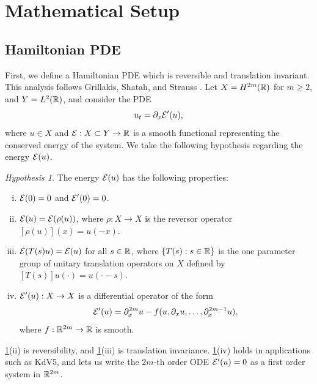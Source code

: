 \documentclass[12pt]{elsarticle}
\theoremstyle{plain}
\theoremstyle{definition}
\theoremstyle{remark}
\newtheorem{hypothesis}[theorem]{Hypothesis}
\numberwithin{theorem}{section}
\numberwithin{equation}{section}
\begin{document}
\section{Mathematical Setup}\label{sec:setup}

\subsection{Hamiltonian PDE}\label{sec:HamPDE}

First, we define a Hamiltonian PDE which is reversible and translation invariant. This analysis follows Grillakis, Shatah, and Strauss \cite{Grillakis1987}. Let $X = H^{2m}(\mathbb{R})$ for $m \geq 2$, and $Y = L^2(\mathbb{R})$, and consider the PDE
\begin{equation}\label{genPDE}
u_t = \partial_x \mathcal{E}'(u),
\end{equation}
where $u \in X$ and $\mathcal{E}: X \subset Y \rightarrow \mathbb{R}$ is a smooth functional representing the conserved energy of the system. We take the following hypothesis regarding the energy $\mathcal{E}(u)$.

\begin{hypothesis}\label{hyp:E}
The energy $\mathcal{E}(u)$ has the following properties:
\begin{enumerate}[(i)]
\item $\mathcal{E}(0) = 0$ and $\mathcal{E}'(0) = 0$.
\item $\mathcal{E}(u) = \mathcal{E}(\rho(u))$, where $\rho: X \rightarrow X$ is the reversor operator $[\rho(u)](x) = u(-x)$.
\item $\mathcal{E}(T(s)u) = \mathcal{E}(u)$ for all $s \in \mathbb{R}$, where $\{T(s) : s \in \mathbb{R} \}$ is the one parameter group of unitary translation operators on $X$ defined by $[T(s)]u(\cdot) = u(\cdot - s)$.
\item $\mathcal{E}'(u): X \rightarrow X$ is a differential operator of the form
\begin{equation}\label{Eprimeuform}
\mathcal{E}'(u) = \partial_x^{2m}u - f(u, \partial_x u, \dots, \partial_x^{2m-1} u),
\end{equation}
where $f: \mathbb{R}^{2m} \rightarrow \mathbb{R}$ is smooth.
\end{enumerate}
\end{hypothesis}

\noi \cref{hyp:E}(ii) is reversibility, and \cref{hyp:E}(iii) is translation invariance. \cref{hyp:E}(iv) holds in applications such as KdV5, and lets us write the $2m$-th order ODE $\mathcal{E}'(u) = 0$ as a first order system in $\mathbb{R}^{2m}$. 
\end{document}
